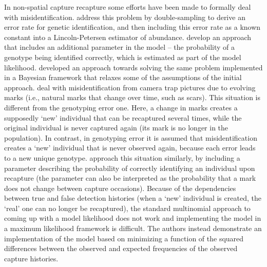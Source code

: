 In non-spatial capture recapture some efforts have been made to
formally deal with misidentification. \citet{stevick_etal:2001}
address this problem by double-sampling to derive an error rate for
genetic identification, and then including this error rate as a known
constant into a Lincoln-Petersen estimator of
abundance. \citet{lukacs_burnham:2005} develop an approach that
includes an additional parameter in the model -- the probability of a
genotype being identified correctly, which is estimated as part of the
model likelihood. \citet{link_etal:2010} developed an approach towards
solving the same problem implemented in a Bayesian framework that
relaxes some of the assumptions of the initial approach.
\citet{yoshizaki_etal:2009} deal with misidentification from camera
trap pictures due to evolving marks (i.e., natural marks that change
over time, such as scars). This situation is different from the
genotyping error one. Here, a change in marks creates a supposedly
`new' individual that can be recaptured several times, while the
original individual is never captured again (its mark is no longer in
the population). In contrast, in genotyping error it is assumed that
misidentification creates a `new' individual that is never observed
again, because each error leads to a new unique
genotype. \citet{yoshizaki_etal:2009} approach this situation
similarly, by including a parameter describing the probability of
correctly identifying an individual upon recapture (the parameter can
also be interpreted as the probability that a mark does not change
between capture occasions). Because of the dependencies between true
and false detection histories (when a `new' individual is created, the
`real' one can no longer be recaptured), the standard multinomial
approach to coming up with a model likelihood does not work and
implementing the model in a maximum likelihood framework is
difficult. The authors instead demonstrate an implementation of the
model based on minimizing a function of the squared differences
between the observed and expected frequencies of the observed capture
histories.

